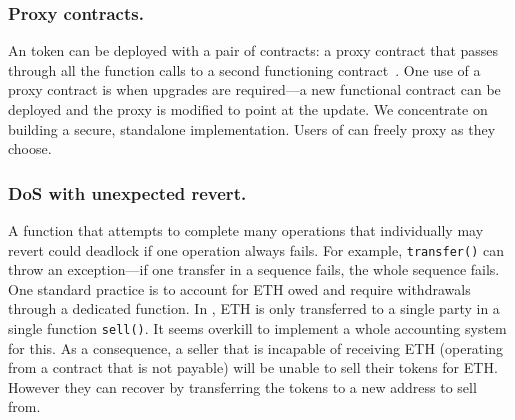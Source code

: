 \subsubsection{Proxy contracts.}

An \erc token can be deployed with a pair of contracts: a proxy contract that passes through all the function calls to a second functioning \erc contract~\cite{ProxyContract,ProxyPatterns}. One use of a proxy contract is when upgrades are required---a new functional contract can be deployed and the proxy is modified to point at the update. We concentrate on building a secure, standalone implementation. Users of \sys can freely proxy \sys as they choose. 

\subsubsection{DoS with unexpected revert.}

A function that attempts to complete many operations that individually may revert could deadlock if one operation always fails. For example, \texttt{transfer()} can throw an exception---if one transfer in a sequence fails, the whole sequence fails. One standard practice is to account for ETH owed and require withdrawals through a dedicated function. In \sys, ETH is only transferred to a single party in a single function \texttt{sell()}. It seems overkill to implement a whole accounting system for this. As a consequence, a seller that is incapable of receiving ETH (\eg operating from a contract that is not payable) will be unable to sell their tokens for ETH. However they can recover by transferring the tokens to a new address to sell from. 


